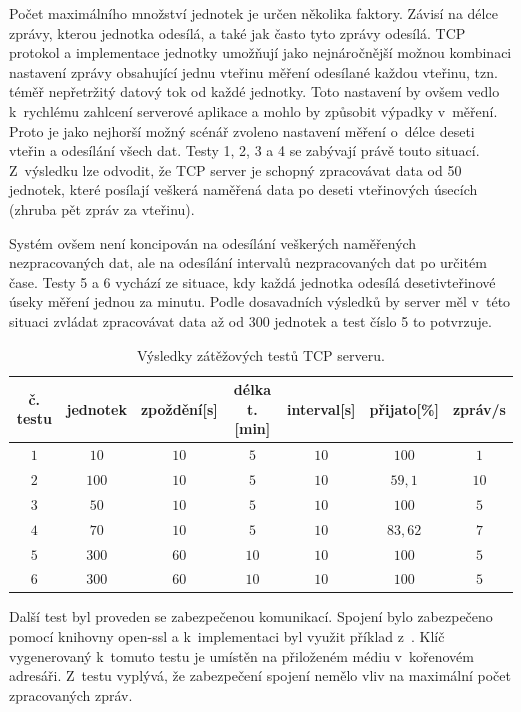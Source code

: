 Počet maximálního množství jednotek je určen několika faktory. Závisí na délce zprávy, kterou jednotka odesílá, a také jak často tyto zprávy odesílá. TCP protokol a implementace jednotky umožňují jako nejnáročnější možnou kombinaci nastavení zprávy obsahující jednu vteřinu měření odesílané každou vteřinu, tzn. téměř nepřetržitý datový tok od každé jednotky. Toto nastavení by ovšem vedlo k~rychlému zahlcení serverové aplikace a mohlo by způsobit výpadky v~měření. Proto je jako nejhorší možný scénář zvoleno nastavení měření o~délce deseti vteřin a odesílání všech dat. Testy 1, 2, 3 a 4 se zabývají právě touto situací. Z~výsledku lze odvodit, že TCP server je schopný zpracovávat data od 50 jednotek, které posílají veškerá naměřená data po deseti vteřinových úsecích (zhruba pět zpráv za vteřinu). 

Systém ovšem není koncipován na odesílání veškerých naměřených nezpracovaných dat, ale na odesílání intervalů nezpracovaných dat po určitém čase. Testy 5 a 6 vychází ze situace, kdy každá jednotka odesílá desetivteřinové úseky měření jednou za minutu. Podle dosavadních výsledků by server měl v~této situaci zvládat zpracovávat data až od 300 jednotek a test číslo 5 to potvrzuje.

\begin{table}[h]
    \begin{center}
        \begin{tabular}{|c|c|c|c|c|c|c|}
        \hline
             č. testu & jednotek & zpoždění[s] & délka t.[min] & interval[s] &  přijato[\%] & zpráv/s\\ \hline
             $1$ & $10$ & $10$ & $5$ & $10$ & $100$ & $1$  \\\hline
             $2$ & $100$ & $10$ & $5$ & $10$ & $59,1$ & $10$  \\\hline
             $3$ & $50$ & $10$ & $5$ & $10$ & $100$ & $5$  \\\hline
             $4$ & $70$ & $10$ & $5$ & $10$ & $83,62$ & $7$  \\\hline
             $5$ & $300$ & $60$ & $10$ & $10$ & $100$ & $5$  \\\hline
             $6$ & $300$ & $60$ & $10$ & $10$ & $100$ & $5$  \\\hline
        \end{tabular}
        \caption{Výsledky zátěžových testů TCP serveru.} \label{tab:graph_test_2}
    \end{center}
\end{table}
Další test byl proveden se zabezpečenou komunikací. Spojení bylo zabezpečeno pomocí knihovny open-ssl a k~implementaci byl využit příklad z~\cite{openssl}. Klíč vygenerovaný k~tomuto testu je umístěn na přiloženém médiu v~kořenovém adresáři. Z~testu vyplývá, že zabezpečení spojení nemělo vliv na maximální počet zpracovaných zpráv.

